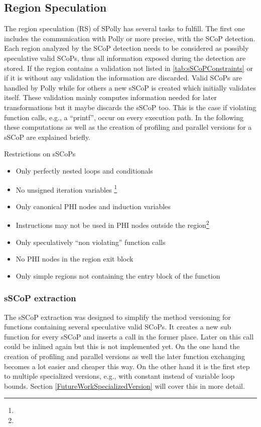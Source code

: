 \subsection{Region Speculation}
The region speculation (RS) of SPolly has several tasks to fulfill. The first 
one includes the communication with Polly or more precise, 
with the SCoP detection. Each region analyzed by the SCoP detection needs to be
considered as possibly speculative valid SCoPs, thus all information exposed 
during the detection are stored. If the region contains a validation not 
listed in \ref{tab:sSCoPConstraints} or if it is without any validation
the information are discarded. Valid SCoPs are handled by Polly while for others
a new sSCoP is created which initially validates itself. 
These validation mainly computes information needed for later
transformations but it maybe discards the sSCoP too. This is the case if 
violating function calls, e.g., a ``printf'', occur on every execution path. 
In the following these computations as well as the creation of 
profiling and parallel versions for a sSCoP are explained briefly. 


\begin{table}[htbp]
  \centering
  \caption{Restrictions on sSCoPs}
    \begin{itemize}
      \item Only perfectly nested loops and conditionals
      \item No unsigned iteration variables \footnote{}
      \item Only canonical PHI nodes and induction variables
      \item Instructions may not be used in PHI nodes outside the region\footnote{}
      \item Only speculatively ``non violating'' function calls
      \item No PHI nodes in the region exit block
      \item Only simple regions not containing the entry block of the function
    \end{itemize}
  \label{tab:sSCoPConstraints}
\end{table}


\subsubsection{sSCoP extraction}
The sSCoP extraction was designed to simplify the method versioning for functions 
containing several speculative valid SCoPs. It creates a new sub function for 
every sSCoP and inserts a call in the former place. Later on this call could be
inlined again but this is not implemented yet. On the one hand the creation 
of profiling and parallel versions as well the later function exchanging becomes
a lot easier and cheaper this way. On the other hand it is the first step to 
multiple specialized versions, e.g., with constant instead of variable loop 
bounds. Section \ref{FutureWorkSpecializedVersion} will cover this in more 
detail.



